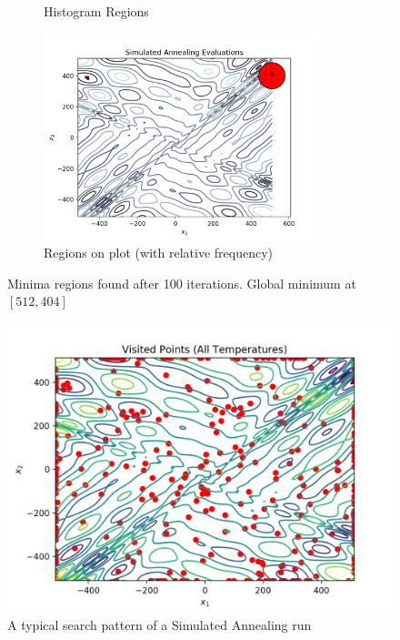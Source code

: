 \documentclass[12pt]{article}
\begin{document}
\begin{enumerate}
\begin{enumerate}
\begin{itemize}
\begin{figure}[H]
\begin{subfigure}{8cm}
		\caption{Histogram Regions}
		\end{subfigure}%
		\begin{subfigure}{8cm}
		\centering
		\includegraphics[width=8cm]{a_hist_plot}
		\caption{Regions on plot (with relative frequency)}
		\end{subfigure}
		\caption{Minima regions found after 100 iterations. Global minimum at $[512, 404]$}
		\label{fig2}
		\end{figure}
		\begin{figure}[H]
		\centering
		\includegraphics[width=\textwidth]{a_search_typical.png}
		\caption{A typical search pattern of a Simulated Annealing run}
		\label{fig3}
		\end{figure}
		\begin{figure}[H]
		\centering

\end{figure}
\end{itemize}
\end{enumerate}
\end{enumerate}
\end{document}
